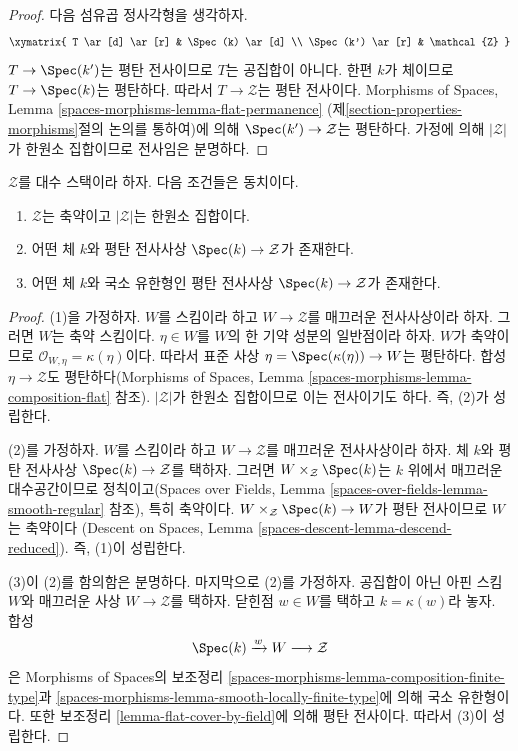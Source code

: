 \begin{proof}
다음 섬유곱 정사각형을 생각하자.
$$
\xymatrix{
T \ar[d] \ar[r] & \Spec(k) \ar[d] \\
\Spec(k') \ar[r] & \mathcal{Z}
}
$$
$T \to \Spec(k')$는 평탄 전사이므로 $T$는 공집합이 아니다.
한편 $k$가 체이므로 $T \to \Spec(k)$는 평탄하다. 따라서
$T \to \mathcal{Z}$는 평탄 전사이다. Morphisms of Spaces,
Lemma \ref{spaces-morphisms-lemma-flat-permanence}
(제\ref{section-properties-morphisms}절의 논의를 통하여)에 의해
$\Spec(k') \to \mathcal{Z}$는 평탄하다. 가정에 의해
$|\mathcal{Z}|$가 한원소 집합이므로 전사임은 분명하다.
\end{proof}

\begin{lemma}
\label{lemma-unique-point}
$\mathcal{Z}$를 대수 스택이라 하자. 다음 조건들은 동치이다.
\begin{enumerate}
\item $\mathcal{Z}$는 축약이고 $|\mathcal{Z}|$는 한원소 집합이다.
\item 어떤 체 $k$와 평탄 전사사상 $\Spec(k) \to \mathcal{Z}$가 존재한다.
\item 어떤 체 $k$와 국소 유한형인 평탄 전사사상
$\Spec(k) \to \mathcal{Z}$가 존재한다.
\end{enumerate}
\end{lemma}

\begin{proof}
(1)을 가정하자. $W$를 스킴이라 하고 $W \to \mathcal{Z}$를
매끄러운 전사사상이라 하자. 그러면 $W$는 축약 스킴이다.
$\eta \in W$를 $W$의 한 기약 성분의 일반점이라 하자.
$W$가 축약이므로 $\mathcal{O}_{W, \eta} = \kappa(\eta)$이다.
따라서 표준 사상 $\eta = \Spec(\kappa(\eta)) \to W$는 평탄하다.
합성 $\eta \to \mathcal{Z}$도 평탄하다(Morphisms of Spaces,
Lemma \ref{spaces-morphisms-lemma-composition-flat} 참조).
$|\mathcal{Z}|$가 한원소 집합이므로 이는 전사이기도 하다.
즉, (2)가 성립한다.

\medskip\noindent
(2)를 가정하자. $W$를 스킴이라 하고 $W \to \mathcal{Z}$를
매끄러운 전사사상이라 하자. 체 $k$와 평탄 전사사상
$\Spec(k) \to \mathcal{Z}$를 택하자. 그러면
$W \times_\mathcal{Z} \Spec(k)$는 $k$ 위에서 매끄러운 대수공간이므로
정칙이고(Spaces over Fields,
Lemma \ref{spaces-over-fields-lemma-smooth-regular} 참조), 특히 축약이다.
$W \times_\mathcal{Z} \Spec(k) \to W$가 평탄 전사이므로 $W$는 축약이다
(Descent on Spaces, Lemma \ref{spaces-descent-lemma-descend-reduced}).
즉, (1)이 성립한다.

\medskip\noindent
(3)이 (2)를 함의함은 분명하다. 마지막으로 (2)를 가정하자.
공집합이 아닌 아핀 스킴 $W$와 매끄러운 사상
$W \to \mathcal{Z}$를 택하자. 닫힌점 $w \in W$를 택하고
$k = \kappa(w)$라 놓자. 합성
$$
\Spec(k) \xrightarrow{w} W \longrightarrow \mathcal{Z}
$$
은 Morphisms of Spaces의 보조정리
\ref{spaces-morphisms-lemma-composition-finite-type}과
\ref{spaces-morphisms-lemma-smooth-locally-finite-type}에 의해 국소 유한형이다.
또한 보조정리 \ref{lemma-flat-cover-by-field}에 의해 평탄 전사이다.
따라서 (3)이 성립한다.
\end{proof}

